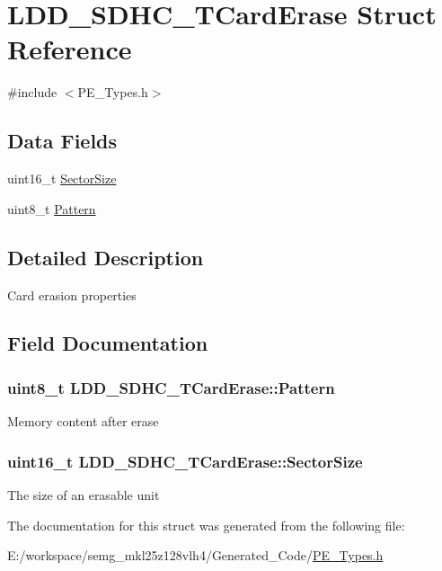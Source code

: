 \hypertarget{struct_l_d_d___s_d_h_c___t_card_erase}{\section{L\-D\-D\-\_\-\-S\-D\-H\-C\-\_\-\-T\-Card\-Erase Struct Reference}
\label{struct_l_d_d___s_d_h_c___t_card_erase}
}


{\ttfamily \#include $<$P\-E\-\_\-\-Types.\-h$>$}

\subsection*{Data Fields}
\begin{DoxyCompactItemize}
\item 
uint16\-\_\-t \hyperlink{struct_l_d_d___s_d_h_c___t_card_erase_a3c0c33e89b65f4f6bfd6043585df5486}{Sector\-Size}
\item 
uint8\-\_\-t \hyperlink{struct_l_d_d___s_d_h_c___t_card_erase_a440e717a0c559282b7e277bf0872bee3}{Pattern}
\end{DoxyCompactItemize}


\subsection{Detailed Description}
Card erasion properties 

\subsection{Field Documentation}
\hypertarget{struct_l_d_d___s_d_h_c___t_card_erase_a440e717a0c559282b7e277bf0872bee3}{
\subsubsection[{Pattern}]{\setlength{\rightskip}{0pt plus 5cm}uint8\-\_\-t L\-D\-D\-\_\-\-S\-D\-H\-C\-\_\-\-T\-Card\-Erase\-::\-Pattern}}\label{struct_l_d_d___s_d_h_c___t_card_erase_a440e717a0c559282b7e277bf0872bee3}
Memory content after erase \hypertarget{struct_l_d_d___s_d_h_c___t_card_erase_a3c0c33e89b65f4f6bfd6043585df5486}{
\subsubsection[{Sector\-Size}]{\setlength{\rightskip}{0pt plus 5cm}uint16\-\_\-t L\-D\-D\-\_\-\-S\-D\-H\-C\-\_\-\-T\-Card\-Erase\-::\-Sector\-Size}}\label{struct_l_d_d___s_d_h_c___t_card_erase_a3c0c33e89b65f4f6bfd6043585df5486}
The size of an erasable unit 

The documentation for this struct was generated from the following file\-:\begin{DoxyCompactItemize}
\item 
E\-:/workspace/semg\-\_\-mkl25z128vlh4/\-Generated\-\_\-\-Code/\hyperlink{_p_e___types_8h}{P\-E\-\_\-\-Types.\-h}\end{DoxyCompactItemize}
